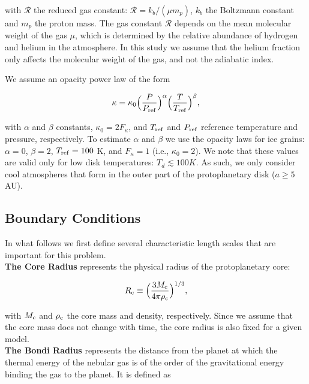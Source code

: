 \documentclass[apj]{emulateapj}
\newcommand{\co}{_{\rm c}}
\begin{document}
\noindent with  $\mathcal{R}$ the reduced gas constant: $\mathcal{R}=k_b/(\mu m_p)$, $k_b$ the Boltzmann constant and $m_p$ the proton mass. The gas constant $\mathcal{R}$ depends on the mean molecular weight of the gas $\mu$, which is determined by the relative abundance of hydrogen and helium in the atmosphere. In this study we assume that the helium fraction only affects the molecular weight of the gas, and not the adiabatic index.%

We assume an opacity power law of the form

\begin{equation}
\label{eq:opacitylaw}
\kappa=\kappa_0 \Big(\frac{P}{P_{\rm{ref}}}\Big)^{\alpha} \Big(\frac{T}{T_{\rm{ref}}}\Big)^{\beta},
\end{equation}  

\noindent with $\alpha$ and $\beta$ constants, $\kappa_0=2 F_{\kappa}$, and $T_{\rm{ref}}$ and $P_{\rm{ref}}$ reference temperature and pressure, respectively. To estimate $\alpha$ and $\beta$ we use the \citet{bell94} opacity laws for ice grains: $\alpha =0 $, $\beta=2$, $T_{\rm{ref}}=100$ K, and $F_{\kappa}=1$ (i.e., $\kappa_0=2$). We note that these values are valid only for low disk temperatures: $T_d \lesssim 100 K$. As such, we only consider cool atmospheres that form in the outer part of the protoplanetary disk ($a \geq 5$ AU).

\subsection{Boundary Conditions}
\label{BCs}


In what follows we first define several characteristic length scales that are important for this problem. \\

\textbf{The Core Radius} represents the physical radius of the protoplanetary core:

\begin{equation}
\label{eq:rc}
R\co \equiv \Big(\frac{3 M\co}{4 \pi \rho\co}\Big)^{1/3},
\end{equation}

\noindent with $M\co$ and $\rho\co$ the core mass and density, respectively. Since we assume that the core mass does not change with time, the core radius is also fixed for a given model. \\

\textbf{The Bondi Radius} represents the distance from the planet at which the thermal energy of the nebular gas is of the order of the gravitational energy binding the gas to the planet. It is defined as
\end{document}
